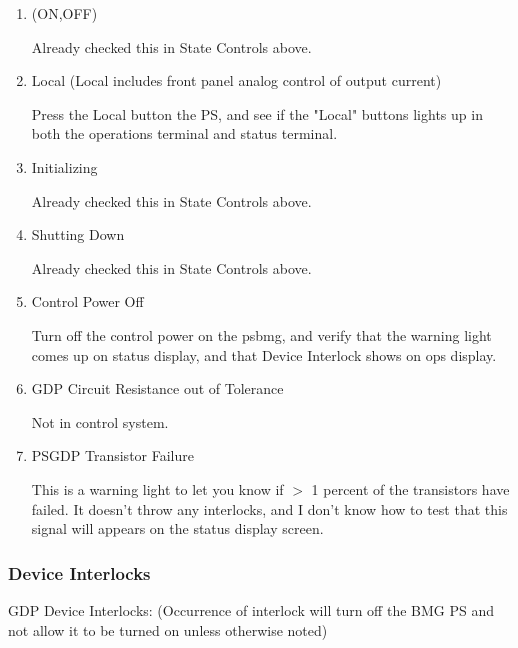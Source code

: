 \documentclass[11pt]{book}		%
\begin{document}
\begin{enumerate}
 \item (ON,OFF)

\color{red}
Already checked this in State Controls above.
\color{black}

 \item Local (Local includes front panel analog control of output current)

\color{red}
Press the Local button the PS, and see if the "Local" buttons lights up in both the operations terminal and status terminal.
\color{black}

 \item Initializing

\color{red}
Already checked this in State Controls above.
\color{black}

 \item Shutting Down

\color{red}
Already checked this in State Controls above.
\color{black}

 \item Control Power Off

\color{red}
Turn off the control power on the psbmg, and verify that the warning light comes up on status display, and that Device Interlock shows on ops display.
\color{black}

 \item GDP Circuit Resistance out of Tolerance

\color{red}
Not in control system.
\color{black}

 \item PSGDP Transistor Failure

\color{red}
This is a warning light to let you know if $>$ 1 percent of the transistors have failed. It doesn't throw any interlocks, and I don't know how to test that this signal will appears on the status display screen.
\color{black}


\end{enumerate}

\subsubsection{Device Interlocks}

GDP Device Interlocks:
(Occurrence of interlock will turn off the BMG PS and not allow it to be turned on unless otherwise noted)
\end{document}
